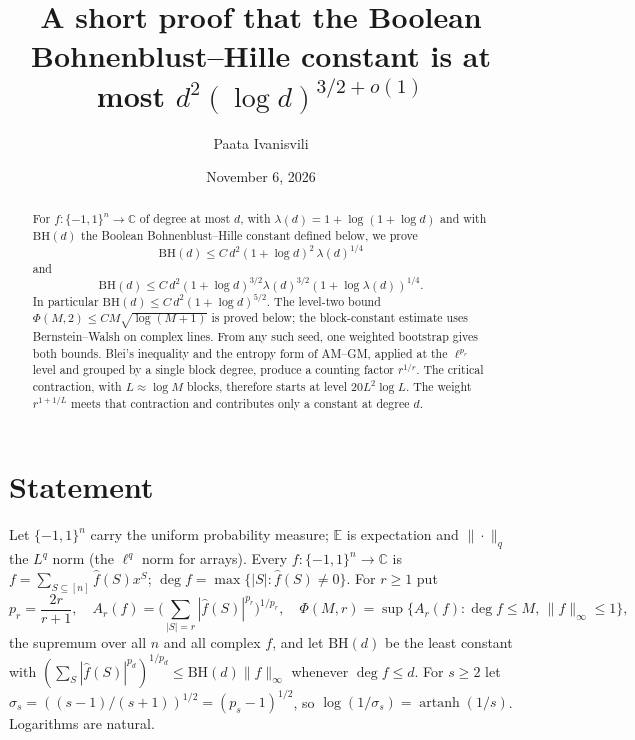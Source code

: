 \documentclass[11pt]{amsart}
\title[A short proof of the Boolean Bohnenblust--Hille bound]{A short proof that the Boolean Bohnenblust--Hille constant is at most $d^{2}(\log d)^{3/2+o(1)}$}
\author{Paata Ivanisvili}
\date{November 6, 2026}
\theoremstyle{definition}
\newcommand{\C}{\mathbb{C}}
\newcommand{\E}{\mathbb{E}}
\newcommand{\BH}{\mathrm{BH}}
\newcommand{\hf}{\widehat f}
\newcommand{\artanh}{\operatorname{artanh}}
\begin{document}
\begin{abstract}
For $f:\{-1,1\}^n\to\C$ of degree at most $d$, with $\lambda(d)=1+\log(1+\log d)$ and with $\BH(d)$ the Boolean Bohnenblust--Hille constant defined below, we prove
\[
\BH(d)\le C\,d^{2}(1+\log d)^{2}\,\lambda(d)^{1/4}
\]
and
\[
\BH(d)\le C\,d^{2}(1+\log d)^{3/2}\lambda(d)^{3/2}(1+\log\lambda(d))^{1/4}.
\]
In particular $\BH(d)\le C\,d^2(1+\log d)^{5/2}$. The level-two bound $\Phi(M,2)\le CM\sqrt{\log(M+1)}$ is proved below; the block-constant estimate uses Bernstein--Walsh on complex lines. From any such seed, one weighted bootstrap gives both bounds. Blei's inequality and the entropy form of AM--GM, applied at the $\ell^{p_r}$ level and grouped by a single block degree, produce a counting factor $r^{1/r}$. The critical contraction, with $L\approx\log M$ blocks, therefore starts at level $20L^2\log L$. The weight $r^{1+1/L}$ meets that contraction and contributes only a constant at degree $d$.
\end{abstract}

\makeatletter
\let\aidisc@setabstracta\@setabstracta
\def\@setabstracta{\par\vskip 10pt{\centering\small\itshape
This proof was generated on November 6, 2026, by Grok Bot using Cursor’s agents, guided by several prompts from Paata Ivanisvili.
\par}\aidisc@setabstracta}
\makeatother

\maketitle

\section{Statement}

Let $\{-1,1\}^n$ carry the uniform probability measure; $\E$ is expectation and $\|\cdot\|_q$ the $L^q$ norm (the $\ell^q$ norm for arrays). Every $f:\{-1,1\}^n\to\C$ is $f=\sum_{S\subseteq[n]}\hf(S)x^S$; $\deg f=\max\{|S|:\hf(S)\ne0\}$. For $r\ge1$ put
\[
p_r=\frac{2r}{r+1},\quad A_r(f)=\Big(\sum_{|S|=r}|\hf(S)|^{p_r}\Big)^{1/p_r},\quad \Phi(M,r)=\sup\{A_r(f):\deg f\le M,\,\|f\|_\infty\le1\},
\]
the supremum over all $n$ and all complex $f$, and let $\BH(d)$ be the least constant with $(\sum_S|\hf(S)|^{p_d})^{1/p_d}\le\BH(d)\|f\|_\infty$ whenever $\deg f\le d$. For $s\ge2$ let $\sigma_s=((s-1)/(s+1))^{1/2}=(p_s-1)^{1/2}$, so $\log(1/\sigma_s)=\artanh(1/s)$. Logarithms are natural.
\end{document}
